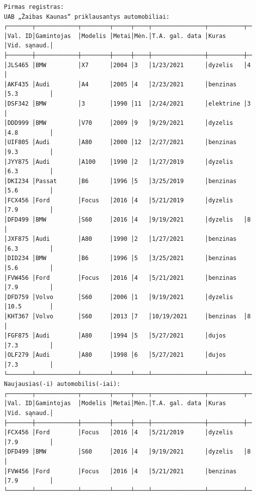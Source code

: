 \documentclass{article}
\begin{document}
\begin{verbatim}
Pirmas registras:
UAB „Žaibas Kaunas“ priklausantys automobiliai:
┌───────┬────────────┬────────┬─────┬────┬───────────────┬──────────┬────────────┐
│Val. ID│Gamintojas  │Modelis │Metai│Mėn.│T.A. gal. data │Kuras     │Vid. sąnaud.│
├───────┼────────────┼────────┼─────┼────┼───────────────┼──────────┼────────────┤
│JLS465 │BMW         │X7      │2004 │3   │1/23/2021      │dyzelis   │4           │
│AKF435 │Audi        │A4      │2005 │4   │2/23/2021      │benzinas  │5.3         │
│DSF342 │BMW         │3       │1990 │11  │2/24/2021      │elektrine │3           │
│DDD999 │BMW         │V70     │2009 │9   │9/29/2021      │dyzelis   │4.8         │
│UIF805 │Audi        │A80     │2000 │12  │2/27/2021      │benzinas  │9.3         │
│JYY875 │Audi        │A100    │1990 │2   │1/27/2019      │dyzelis   │6.3         │
│DKI234 │Passat      │B6      │1996 │5   │3/25/2019      │benzinas  │5.6         │
│FCX456 │Ford        │Focus   │2016 │4   │5/21/2019      │dyzelis   │7.9         │
│DFD499 │BMW         │S60     │2016 │4   │9/19/2021      │dyzelis   │8           │
│JXF875 │Audi        │A80     │1990 │2   │1/27/2021      │benzinas  │6.3         │
│DID234 │BMW         │B6      │1996 │5   │3/25/2021      │benzinas  │5.6         │
│FVW456 │Ford        │Focus   │2016 │4   │5/21/2021      │benzinas  │7.9         │
│DFD759 │Volvo       │S60     │2006 │1   │9/19/2021      │dyzelis   │10.5        │
│KHT367 │Volvo       │S60     │2013 │7   │10/19/2021     │benzinas  │8           │
│FGF875 │Audi        │A80     │1994 │5   │5/27/2021      │dujos     │7.3         │
│OLF279 │Audi        │A80     │1998 │6   │5/27/2021      │dujos     │7.3         │
└───────┴────────────┴────────┴─────┴────┴───────────────┴──────────┴────────────┘
Naujausias(-i) automobilis(-iai):
┌───────┬────────────┬────────┬─────┬────┬───────────────┬──────────┬────────────┐
│Val. ID│Gamintojas  │Modelis │Metai│Mėn.│T.A. gal. data │Kuras     │Vid. sąnaud.│
├───────┼────────────┼────────┼─────┼────┼───────────────┼──────────┼────────────┤
│FCX456 │Ford        │Focus   │2016 │4   │5/21/2019      │dyzelis   │7.9         │
│DFD499 │BMW         │S60     │2016 │4   │9/19/2021      │dyzelis   │8           │
│FVW456 │Ford        │Focus   │2016 │4   │5/21/2021      │benzinas  │7.9         │
└───────┴────────────┴────────┴─────┴────┴───────────────┴──────────┴────────────┘


\end{verbatim}
\end{document}
